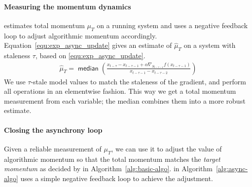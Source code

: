 \paragraph{Measuring the momentum dynamics}
\Asynctuner estimates total momentum $\mu_{T}$ on a running system and uses a negative feedback loop to adjust algorithmic momentum accordingly.
Equation~\eqref{equ:exp_async_update} gives an estimate of $\hat{\mu}_T$ on a system with staleness $\tau$, based on \eqref{equ:exp_async_update}.
\begin{align}
\hat{\mu}_T
					= \mathop{\mathsf{median}}\left(
							\frac{x_{t - \tau} - x_{t - \tau-1} + \alpha \nabla_{S_{t-\tau -1}} f(x_{t - \tau - 1} )}
							{x_{t - \tau-1} - x_{t - \tau-2}}
					\right)
\label{eqn:momentum_measurement}
\end{align}
We use $\tau$-stale model values to match the staleness of the gradient,  and perform all operations in an elementwise fashion. 
This way we get a total momentum measurement from each variable; 
the median combines them into a more robust estimate.

\paragraph{Closing the asynchrony loop}
Given a reliable measurement of $\mu_{T}$, 
we can use it to adjust the value of algorithmic momentum so that the total momentum matches the \emph{target momentum} as decided by \tuner in Algorithm~\ref{alg:basic-algo}.
\Asynctuner in Algorithm~\ref{alg:async-algo} %
uses a simple negative feedback loop to achieve the adjustment.


